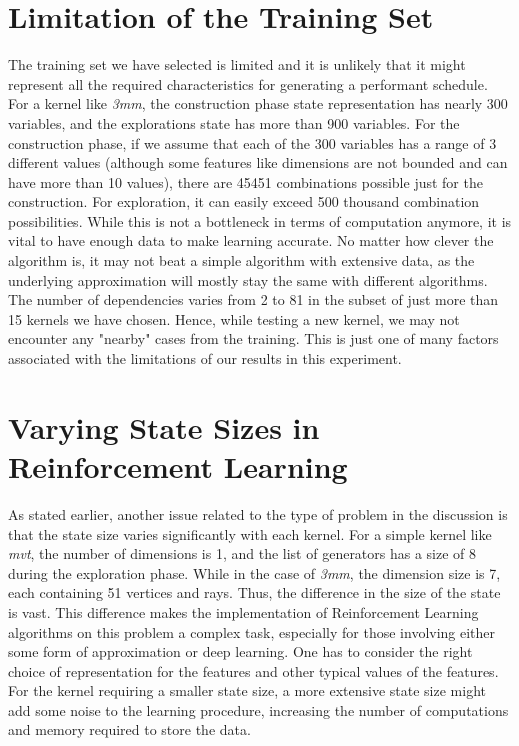 \documentclass[logo,msc]{infthesis}           %
\begin{document}
\section{Limitation of the Training Set}
The training set we have selected is limited and it is unlikely that it might represent all the required characteristics for generating a performant schedule. For a kernel like \textit{3mm}, the construction phase state representation has nearly 300 variables, and the explorations state has more than 900 variables. For the construction phase, if we assume that each of the 300 variables has a range of 3 different values (although some features like dimensions are not bounded and can have more than 10 values), there are 45451 combinations possible just for the construction. For exploration, it can easily exceed 500 thousand combination possibilities. While this is not a bottleneck in terms of computation anymore, it is vital to have enough data to make learning accurate. No matter how clever the algorithm is, it may not beat a simple algorithm with extensive data, as the underlying approximation will mostly stay the same with different algorithms. The number of dependencies varies from 2 to 81 in the subset of just more than 15 kernels we have chosen. Hence, while testing a new kernel, we may not encounter any "nearby" cases from the training. This is just one of many factors associated with the limitations of our results in this experiment. 

\section{Varying State Sizes in Reinforcement Learning}
As stated earlier, another issue related to the type of problem in the discussion is that the state size varies significantly with each kernel. For a simple kernel like \textit{mvt}, the number of dimensions is 1, and the list of generators has a size of 8 during the exploration phase. While in the case of \textit{3mm}, the dimension size is 7, each containing 51 vertices and rays. Thus, the difference in the size of the state is vast. This difference makes the implementation of Reinforcement Learning algorithms on this problem a complex task, especially for those involving either some form of approximation or deep learning. One has to consider the right choice of representation for the features and other typical values of the features. For the kernel requiring a smaller state size, a more extensive state size might add some noise to the learning procedure, increasing the number of computations and memory required to store the data.
\end{document}
